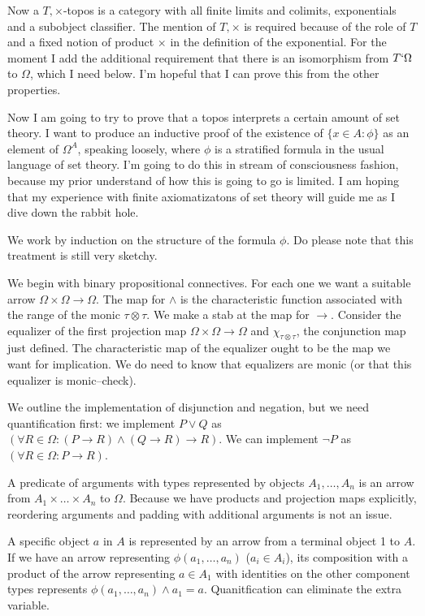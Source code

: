 \documentclass[12pt]{article}
\begin{document}
Now a $T,\times$-topos is a category with all finite limits and colimits, exponentials and a subobject classifier.  The mention of $T,\times$ is required because of the role of $T$ and a fixed notion of product $\times$ in the definition of the exponential.  For the moment I add the additional requirement that there is an isomorphism from $T`\Omega$ to $\Omega$, which I need below.  I'm hopeful that I can prove this from the other properties.

Now I am going to try to prove that a topos interprets a certain amount of set theory.  I want to produce an inductive proof of the existence of $\{x \in A:\phi\}$ as an element
of $\Omega^A$, speaking loosely, where $\phi$ is a stratified formula in the usual language of set theory.  I'm going to do this in stream of consciousness fashion, because my prior understand of how this is going to go is limited.  I am hoping that my experience with finite axiomatizatons of set theory will guide me as I dive down the rabbit hole.

We work by induction on the structure of the formula $\phi$.  Do please note that this treatment is still very sketchy.

We begin with binary propositional connectives.  For each one we want a suitable arrow $\Omega \times \Omega\rightarrow \Omega$.  The map for $\wedge$ is the characteristic function
associated with the range of the monic $\tau \otimes \tau$.  We make a stab at the map for $\rightarrow$.  Consider the equalizer of the first projection map $\Omega \times \Omega\rightarrow \Omega$
and $\chi_{\tau \otimes \tau}$, the conjunction map just defined.   The characteristic map of the equalizer ought to be the map we want for implication.  We do need to know that equalizers are monic (or that this equalizer is monic--check).

We outline the implementation of disjunction and negation, but we need quantification first:  we implement $P \vee Q$ as $(\forall R \in \Omega:(P \rightarrow R) \wedge (Q \rightarrow R) \rightarrow R)$.  We can implement $\neg P$ as $(\forall R \in \Omega:P \rightarrow R)$.

A predicate of arguments with types represented by objects $A_1, \ldots, A_n$ is an arrow from $A_1 \times \ldots \times A_n$ to $\Omega$.  Because we have products and projection maps explicitly, reordering arguments and padding with additional arguments is not an issue.

A specific object $a$ in $A$ is represented by an arrow from a terminal object 1 to $A$.  If we have an arrow representing $\phi(a_1,\ldots,a_n)$ ($a_i \in A_i$), its composition with a product of
the arrow representing $a \in A_1$ with identities on the other component types represents $\phi(a_1,\ldots,a_n) \wedge a_1 = a$.  Quanitfication can eliminate the extra variable.
\end{document}
